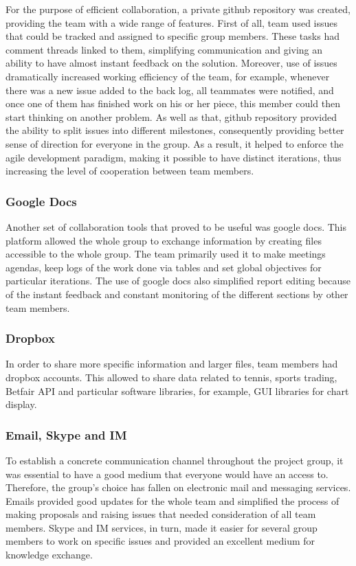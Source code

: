 \documentclass[10pt]{article}
\begin{document}
For the purpose of efficient collaboration, a private github repository was created, providing the team with a wide range of features. First of all, team used issues that could be tracked and assigned to specific group members. These tasks had comment threads linked to them, simplifying communication and giving an ability to have almost instant feedback on the solution. Moreover, use of issues dramatically increased working efficiency of the team, for example, whenever there was a new issue added to the back log, all teammates were notified, and once one of them has finished work on his or her piece, this member could then start thinking on another problem. As well as that, github repository provided the ability to split issues into different milestones, consequently providing better sense of direction for everyone in the group. As a result, it helped to enforce the agile development paradigm, making it possible to have distinct iterations, thus increasing the level of cooperation between team members.

\subsubsection{Google Docs}

Another set of collaboration tools that proved to be useful was google docs. This platform allowed the whole group to exchange information by creating files accessible to the whole group. The team primarily used it to make meetings agendas, keep logs of the work done via tables and set global objectives for particular iterations. The use of google docs also simplified report editing because of the instant feedback and constant monitoring of the different sections by other team members.

\subsubsection{Dropbox}

In order to share more specific information and larger files, team members had dropbox accounts. This allowed to share data related to tennis, sports trading, Betfair API and particular software libraries, for example, GUI libraries for chart display.

\subsubsection{Email, Skype and IM}

To establish a concrete communication channel throughout the project group, it was essential to have a good medium that everyone would have an access to. Therefore, the group's choice has fallen on electronic mail and messaging services. Emails provided good updates for the whole team and simplified the process of making proposals and raising issues that needed consideration of all team members. Skype and IM services, in turn, made it easier for several group members to work on specific issues and provided an excellent medium for knowledge exchange.
\end{document}
